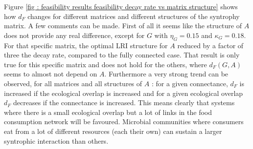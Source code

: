 \documentclass[12pt, titlepage]{report}
\begin{document}
  Figure \ref{fig : feasibility results feasibility decay rate vs matrix structure} shows how $d_F$ changes for different matrices and different structures of the syntrophy matrix. A few comments can be made. First of all it seems like the structure of $A$ does not provide any real difference, except for $G$ with $\eta_G=0.15$ and $\kappa_G=0.18$. For that specific matrix, the optimal LRI structure for $A$ reduced by a factor of three the decay rate, compared to the fully connected case. That result is only true for this specific matrix and does not hold for the others, where $d_F(G,A)$ seems to almost not depend on $A$. Furthermore a very strong trend can be observed, for all matrices and all structures of $A$ : for a given connectance, $d_F$ is increased if the ecological overlap is increased and for a given ecological overlap $d_F$ decreases if the connectance is increased.
  This means clearly that systems where there is a small ecological overlap but a lot of links in the food consumption network will be favoured. Microbial communities where consumers eat from a lot of different resources (\ie each their own) can sustain a larger syntrophic interaction than others.
\end{document}

